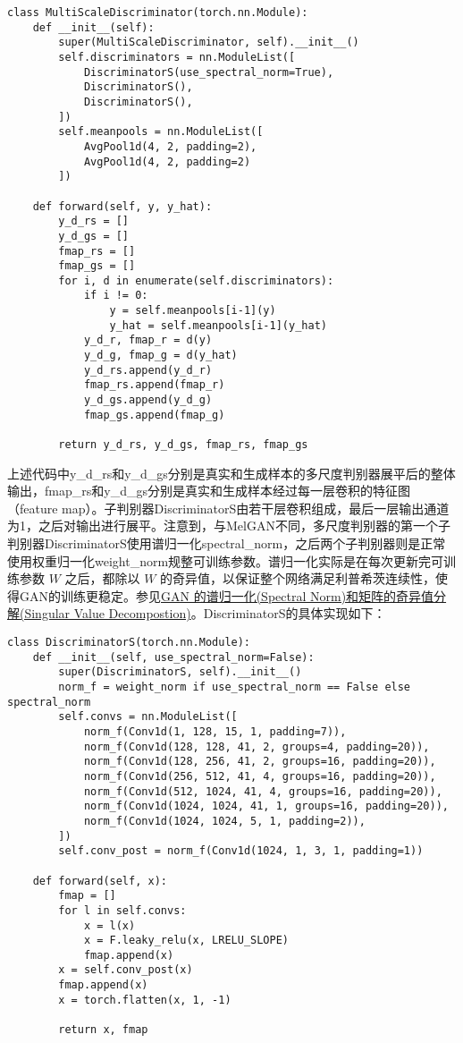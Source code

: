 \documentclass[cn,10pt,math=newtx,citestyle=gb7714-2015,bibstyle=gb7714-2015]{elegantbook}
\begin{document}
\begin{lstlisting}
class MultiScaleDiscriminator(torch.nn.Module):
    def __init__(self):
        super(MultiScaleDiscriminator, self).__init__()
        self.discriminators = nn.ModuleList([
            DiscriminatorS(use_spectral_norm=True),
            DiscriminatorS(),
            DiscriminatorS(),
        ])
        self.meanpools = nn.ModuleList([
            AvgPool1d(4, 2, padding=2),
            AvgPool1d(4, 2, padding=2)
        ])

    def forward(self, y, y_hat):
        y_d_rs = []
        y_d_gs = []
        fmap_rs = []
        fmap_gs = []
        for i, d in enumerate(self.discriminators):
            if i != 0:
                y = self.meanpools[i-1](y)
                y_hat = self.meanpools[i-1](y_hat)
            y_d_r, fmap_r = d(y)
            y_d_g, fmap_g = d(y_hat)
            y_d_rs.append(y_d_r)
            fmap_rs.append(fmap_r)
            y_d_gs.append(y_d_g)
            fmap_gs.append(fmap_g)

        return y_d_rs, y_d_gs, fmap_rs, fmap_gs
\end{lstlisting}

上述代码中y\_d\_rs和y\_d\_gs分别是真实和生成样本的多尺度判别器展平后的整体输出，fmap\_rs和y\_d\_gs分别是真实和生成样本经过每一层卷积的特征图（feature map）。子判别器DiscriminatorS由若干层卷积组成，最后一层输出通道为1，之后对输出进行展平。注意到，与MelGAN不同，多尺度判别器的第一个子判别器DiscriminatorS使用谱归一化spectral\_norm，之后两个子判别器则是正常使用权重归一化weight\_norm规整可训练参数。谱归一化实际是在每次更新完可训练参数 $W$ 之后，都除以 $W$ 的奇异值，以保证整个网络满足利普希茨连续性，使得GAN的训练更稳定。参见\href{https://kaizhao.net/posts/spectral-norm}{GAN 的谱归一化(Spectral Norm)和矩阵的奇异值分解(Singular Value Decompostion)}。DiscriminatorS的具体实现如下：

\begin{lstlisting}
class DiscriminatorS(torch.nn.Module):
    def __init__(self, use_spectral_norm=False):
        super(DiscriminatorS, self).__init__()
        norm_f = weight_norm if use_spectral_norm == False else spectral_norm
        self.convs = nn.ModuleList([
            norm_f(Conv1d(1, 128, 15, 1, padding=7)),
            norm_f(Conv1d(128, 128, 41, 2, groups=4, padding=20)),
            norm_f(Conv1d(128, 256, 41, 2, groups=16, padding=20)),
            norm_f(Conv1d(256, 512, 41, 4, groups=16, padding=20)),
            norm_f(Conv1d(512, 1024, 41, 4, groups=16, padding=20)),
            norm_f(Conv1d(1024, 1024, 41, 1, groups=16, padding=20)),
            norm_f(Conv1d(1024, 1024, 5, 1, padding=2)),
        ])
        self.conv_post = norm_f(Conv1d(1024, 1, 3, 1, padding=1))

    def forward(self, x):
        fmap = []
        for l in self.convs:
            x = l(x)
            x = F.leaky_relu(x, LRELU_SLOPE)
            fmap.append(x)
        x = self.conv_post(x)
        fmap.append(x)
        x = torch.flatten(x, 1, -1)

        return x, fmap
\end{lstlisting}
\end{document}
